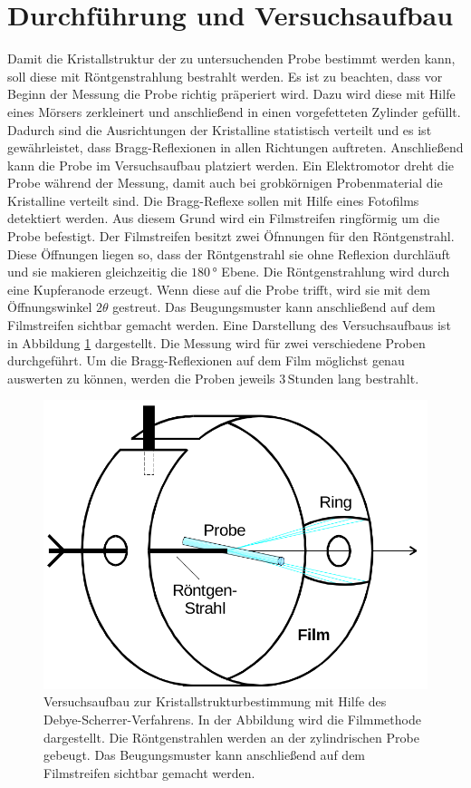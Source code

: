 \section{Durchführung und Versuchsaufbau}

Damit die Kristallstruktur der zu untersuchenden Probe bestimmt werden kann, soll diese mit Röntgenstrahlung bestrahlt werden.
Es ist zu beachten, dass vor Beginn der Messung die Probe richtig präperiert wird. Dazu wird diese mit Hilfe eines Mörsers zerkleinert und anschließend in einen vorgefetteten
Zylinder gefüllt.
Dadurch sind die Ausrichtungen der Kristalline statistisch verteilt und es ist gewährleistet, dass Bragg-Reflexionen in allen Richtungen auftreten.
Anschließend kann die Probe im Versuchsaufbau platziert werden. Ein Elektromotor dreht die Probe während der Messung, damit auch bei grobkörnigen Probenmaterial
die Kristalline verteilt sind.\newline
Die Bragg-Reflexe sollen mit Hilfe eines Fotofilms detektiert werden. Aus diesem Grund wird ein Filmstreifen ringförmig um die Probe befestigt. Der Filmstreifen besitzt zwei Öfnnungen für den
Röntgenstrahl. Diese Öffnungen liegen so, dass der Röntgenstrahl sie ohne Reflexion durchläuft und sie makieren gleichzeitig die $180\,\text{°}$ Ebene.
Die Röntgenstrahlung wird durch eine Kupferanode erzeugt. Wenn diese auf die Probe trifft, wird sie mit dem Öffnungswinkel $2\theta$ gestreut. Das Beugungsmuster kann anschließend auf dem
Filmstreifen sichtbar gemacht werden.
Eine Darstellung des Versuchsaufbaus ist in Abbildung \ref{abb:aufbau} dargestellt.\newline
Die Messung wird für zwei verschiedene Proben durchgeführt. Um die Bragg-Reflexionen auf dem Film möglichst genau auswerten zu können, werden die Proben jeweils
$3\,\text{Stunden}$ lang bestrahlt.

\begin{figure}
  \centering
  \includegraphics[scale=0.35]{aufbau.png}
  \caption{Versuchsaufbau zur Kristallstrukturbestimmung mit Hilfe des Debye-Scherrer-Verfahrens. In der Abbildung wird die Filmmethode dargestellt. Die Röntgenstrahlen werden an der zylindrischen
  Probe gebeugt. Das Beugungsmuster kann anschließend auf dem Filmstreifen sichtbar gemacht werden.}
  \label{abb:aufbau}
\end{figure}
